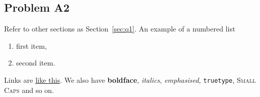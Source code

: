 \subsection{Problem A2}
    Refer to other sections as Section~\ref{sec:q1}. An example of a numbered list
    \begin{enumerate}
        \item first item,
        \item second item.
    \end{enumerate}
    Links are \href{https://google.com}{like this}. We also have \textbf{boldface}, \textit{italics},
    \emph{emphasised}, \texttt{truetype}, \textsc{Small Caps} and so on.
